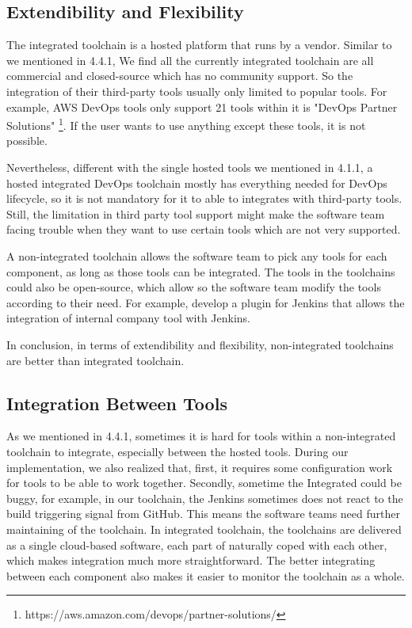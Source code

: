 \subsection{Extendibility and Flexibility}
The integrated toolchain is a hosted platform that runs by a vendor. Similar to we mentioned in 4.4.1, We find all the currently integrated toolchain are all commercial and closed-source which has no community support. So the integration of their third-party tools usually only limited to popular tools. For example, AWS DevOps tools only support 21 tools within it is "DevOps Partner Solutions" \footnote{https://aws.amazon.com/devops/partner-solutions/}. If the user wants to use anything except these tools, it is not possible.
\par
Nevertheless, different with the single hosted tools we mentioned in 4.1.1, a hosted integrated DevOps toolchain mostly has everything needed for DevOps lifecycle, so it is not mandatory for it to able to integrates with third-party tools. Still, the limitation in third party tool support might make the software team facing trouble when they want to use certain tools which are not very supported.
\par
A non-integrated toolchain allows the software team to pick any tools for each component, as long as those tools can be integrated. The tools in the toolchains could also be open-source, which allow so the software team modify the tools according to their need. For example, develop a plugin for Jenkins that allows the integration of internal company tool with Jenkins.
\par
In conclusion, in terms of extendibility and flexibility, non-integrated toolchains are better than integrated toolchain.
\subsection{Integration Between Tools}
As we mentioned in 4.4.1, sometimes it is hard for tools within a non-integrated toolchain to integrate, especially between the hosted tools. 
During our implementation, we also realized that, first, it requires some configuration work for tools to be able to work together. Secondly, sometime the Integrated could be buggy, for example, in our toolchain, the Jenkins sometimes does not react to the build triggering signal from GitHub. This means the software teams need further maintaining of the toolchain.
In integrated toolchain, the toolchains are delivered as a single cloud-based software, each part of naturally coped with each other, which makes integration much more straightforward.
The better integrating between each component also makes it easier to monitor the toolchain as a whole.
